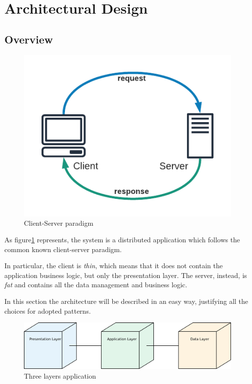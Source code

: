 \documentclass[table, 12pt]{article}
\begin{document}
\newpage

\section{Architectural Design}
\subsection{Overview}
\begin{figure}[H]
    \begin{center}
        \includegraphics[width=\textwidth/2]{assets/Architectural-Design/Client-Server.png}
        \caption{Client-Server paradigm}\label{client_server_par}
    \end{center}
\end{figure}

As figure\ref{client_server_par} represents, the system is a distributed application which follows the common known client-server paradigm.

In particular, the client is \textit{thin}, which means that it does not contain the application business logic, but only the presentation layer. The server, instead, is \textit{fat} and contains all the data management and business logic.

In this section the architecture will be described in an easy way, justifying all the choices for adopted patterns.

\begin{figure}[H]
    \begin{center}
        \includegraphics[width=\textwidth]{assets/Architectural-Design/3-tier.png}
        \caption{Three layers application}\label{three_tier_desc}
    \end{center}
\end{figure}
\end{document}
